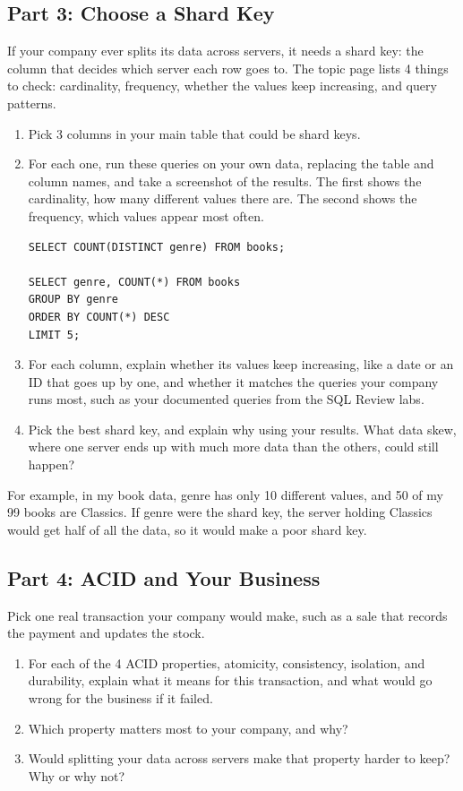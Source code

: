 \documentclass[12pt]{article}
\begin{document}
\subsection*{Part 3: Choose a Shard Key}
If your company ever splits its data across servers, it needs a shard key: the column that decides which server each row goes to. The topic page lists 4 things to check: cardinality, frequency, whether the values keep increasing, and query patterns.
\begin{enumerate}
    \item Pick 3 columns in your main table that could be shard keys.
    \item For each one, run these queries on your own data, replacing the table and column names, and take a screenshot of the results. The first shows the cardinality, how many different values there are. The second shows the frequency, which values appear most often.
\begin{Verbatim}
SELECT COUNT(DISTINCT genre) FROM books;

SELECT genre, COUNT(*) FROM books
GROUP BY genre
ORDER BY COUNT(*) DESC
LIMIT 5;
\end{Verbatim}
    \item For each column, explain whether its values keep increasing, like a date or an ID that goes up by one, and whether it matches the queries your company runs most, such as your documented queries from the SQL Review labs.
    \item Pick the best shard key, and explain why using your results. What data skew, where one server ends up with much more data than the others, could still happen?
\end{enumerate}
For example, in my book data, genre has only 10 different values, and 50 of my 99 books are Classics. If genre were the shard key, the server holding Classics would get half of all the data, so it would make a poor shard key.

\subsection*{Part 4: ACID and Your Business}
Pick one real transaction your company would make, such as a sale that records the payment and updates the stock.
\begin{enumerate}
    \item For each of the 4 ACID properties, atomicity, consistency, isolation, and durability, explain what it means for this transaction, and what would go wrong for the business if it failed.
    \item Which property matters most to your company, and why?
    \item Would splitting your data across servers make that property harder to keep? Why or why not?
\end{enumerate}
\end{document}
